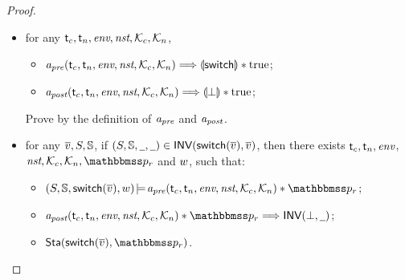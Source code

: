 {\begin{proof}
\begin{itemize}
        \item for any $\textsf{t}_c, \textsf{t}_n, \textit{env}, \textit{nst}, \mathcal{K}_c, \mathcal{K}_n$,
            \begin{itemize}
                \small
                \item $\textit{a}_\textit{pre}(\textsf{t}_c, \textsf{t}_n, \textit{env}, \textit{nst}, \mathcal{K}_c, \mathcal{K}_n) 
                    \Longrightarrow \llparenthesis {\mathsf{switch}} \rrparenthesis * \text{true}$; 
                \item $\textit{a}_\textit{post}(\textsf{t}_c, \textsf{t}_n, \textit{env}, \textit{nst}, \mathcal{K}_c, \mathcal{K}_n) 
                    \Longrightarrow \llparenthesis {\perp} \rrparenthesis * \text{true}$; 
            \end{itemize}   
        \vspace*{0.3em}
        Prove by the definition of $\textit{a}_\textit{pre}$ and $\textit{a}_\textit{post}$.

        \item for any $\overline{v}, S, \mathbb{S}$, 
        if $(S, \mathbb{S}, \underline{\ \,}, \underline{\ \,}) \in 
            \textsf{INV}{(\mathsf{switch}(\overline{v}), \overline{v})}$, 
        then there exists $\textsf{t}_c, \textsf{t}_n, \textit{env}$, $\nst, 
        \hthrdlocalst_c, \hthrdlocalst_n, \relastP_r$ and $w$, 
        such that:
        \begin{itemize}
            \small
            \item $\asrtmodel{(\state, \hpstate, \primsw(\args{\val}), \word)}
                {\Apre(\thrdid_c, \thrdid_n, \env, \nst, \hthrdlocalst_c, 
                \hthrdlocalst_n) \sepstar \relastP_r}$; 
            \item  $\Apost(\thrdid_c, \thrdid_n, \env, \nst, \hthrdlocalst_c, 
                \hthrdlocalst_n) \sepstar \relastP_r \Longrightarrow 
                \INV{(\primdone, \notCare)}$; 
            \item $\Sta(\primsw(\args{\val}), \relastP_r)$. 
        \end{itemize}


\end{itemize}
\end{proof}}

